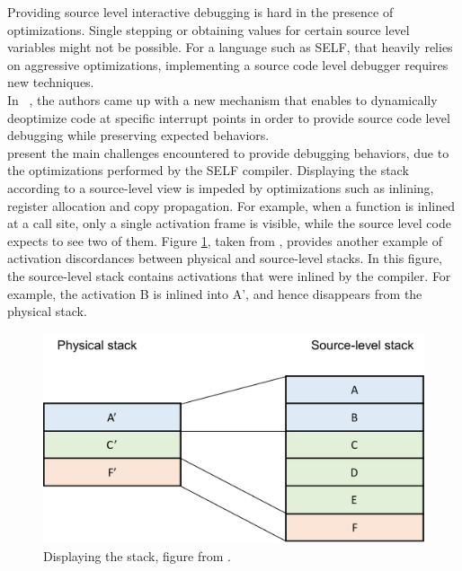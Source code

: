 Providing source level interactive debugging is hard in the presence of optimizations.
Single stepping or obtaining values for certain source level variables might not be possible.
For a language such as SELF, that heavily relies on aggressive optimizations, implementing a source code level debugger requires new techniques.\\

In ~\cite{holzle1992debugging}, the authors came up with a new mechanism that enables to dynamically deoptimize code at specific interrupt points in order to provide source code level debugging while preserving expected behaviors.\\

 present the main challenges encountered to provide debugging behaviors, due to the optimizations performed by the SELF compiler. 
Displaying the stack according to a source-level view is impeded by optimizations such as inlining, register allocation and copy propagation.
For example, when a function is inlined at a call site, only a single activation frame is visible, while the source level code expects to see two of them.
Figure \ref{stackframes}, taken from \cite{holzle1992debugging}, provides another example of activation discordances between physical and source-level stacks.
In this figure, the source-level stack contains activations that were inlined by the compiler. For example, the activation B is inlined into A', and hence disappears from the physical stack.\\
\begin{figure}[h]
\centering
\includegraphics[scale=0.5]{Figures/Figure1}
\decoRule
\caption[physical vs. source-level stacks]{Displaying the stack, figure from \cite{holzle1992debugging}.}
\label{stackframes}
\end{figure}

